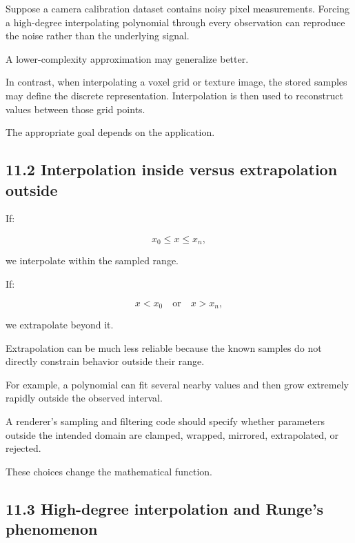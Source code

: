 \hypertarget{02-foundations-ii-ch028-why-the-distinction-matters}{}

Suppose a camera calibration dataset contains noisy pixel measurements. Forcing a high-degree interpolating polynomial through every observation can reproduce the noise rather than the underlying signal.

A lower-complexity approximation may generalize better.

In contrast, when interpolating a voxel grid or texture image, the stored samples may define the discrete representation. Interpolation is then used to reconstruct values between those grid points.

The appropriate goal depends on the application.

\subsection{11.2 Interpolation inside versus extrapolation outside}\label{02-foundations-ii-ch028-interpolation-inside-versus-extrapolation-outside}

\hypertarget{02-foundations-ii-ch028-interpolation-inside-versus-extrapolation-outside}{}

If:

\[ x_0\le x\le x_n, \]

we interpolate within the sampled range.

If:

\[ x<x_0 \quad\text{or}\quad x>x_n, \]

we extrapolate beyond it.

Extrapolation can be much less reliable because the known samples do not directly constrain behavior outside their range.

For example, a polynomial can fit several nearby values and then grow extremely rapidly outside the observed interval.

A renderer's sampling and filtering code should specify whether parameters outside the intended domain are clamped, wrapped, mirrored, extrapolated, or rejected.

These choices change the mathematical function.

\subsection{11.3 High-degree interpolation and Runge's phenomenon}\label{02-foundations-ii-ch028-high-degree-interpolation-and-runges-phenomenon}

